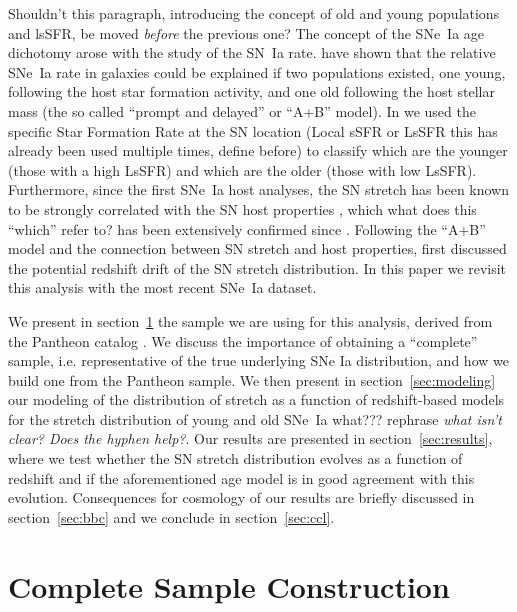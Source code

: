\documentclass[]{aa} %
\newcommand{\nn}[1]{{\textcolor[rgb]{0.25, 0.50, 0}{#1}}}
\newcommand{\yc}[1]{{\textcolor{BrickRed}{#1}}}
\begin{document}
\yc{Shouldn't this paragraph, introducing the concept of old and young populations and lsSFR, be moved \emph{before} the previous one?}
The concept of the SNe~Ia age dichotomy arose with the study of the SN~Ia rate.
\cite{mannucci2005, scannapieco2005, sullivan2006, aubourg2008} have shown that
the relative SNe~Ia rate in galaxies could be explained if two populations
existed, one young, following the host star formation activity, and one old
following the host stellar mass (the so called ``prompt and delayed'' or ``A+B''
model). In \cite{rigault2018} we used the specific Star Formation Rate at the SN
location (Local sSFR or LsSFR \yc{this has already been used multiple times, define before}) to classify which are the younger (those with a
high LsSFR) and which are the older (those with low LsSFR). Furthermore, since
the first SNe~Ia host analyses, the SN stretch has been known to be strongly
correlated with the SN host properties \citep{hamuy1996, hamuy2000}, which \yc{what does this ``which'' refer to?} has
been extensively confirmed since \citep[e.g.][]{neill2009, sullivan2010,
    lampeitl2010, kelly2010, gupta2011, dandrea2011, childress2013, rigault2013,
pan2014, kim19}. Following the ``A+B'' model and the connection between SN stretch
and host properties, \cite{howell2007} first discussed the potential redshift
drift of the SN stretch distribution. In this paper we revisit this analysis
with the most recent SNe~Ia dataset.

We present in section~\ref{sec:sample} the sample we are using for this
analysis, \yc{derived from} the Pantheon catalog \citep{scolnic2018a}. We
discuss the importance of obtaining a ``complete'' sample, i.e. representative of
the true underlying SNe Ia distribution, and how we build one from the Pantheon
sample. We then present in section~\ref{sec:modeling} our modeling of the
distribution of stretch as a function of redshift\nn{-}based models for the stretch
distribution of young and old SNe~Ia \yc{what??? rephrase} \nn{\textit{what isn't clear? Does the hyphen help?}}. Our results are presented in
section~\ref{sec:results}, where we test whether the SN stretch \yc{distribution} evolves as a
function of redshift and if the \yc{aforementioned} age model is in good agreement with this
evolution. Consequences for cosmology of our results are briefly discussed in
section~\ref{sec:bbc} and we conclude in section~\ref{sec:ccl}.

\section{Complete Sample Construction}\label{sec:sample}
\end{document}
